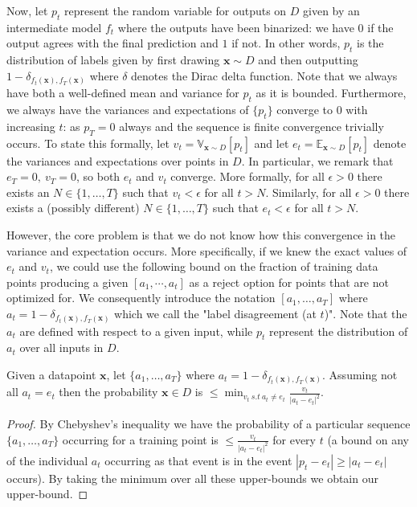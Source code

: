 Now, let $p_{t}$ represent the random variable for outputs on $D$ given by an intermediate model $f_t$ where the outputs have been binarized: we have $0$ if the output agrees with the final prediction and $1$ if not. In other words, $p_{t}$ is the distribution of labels given by first drawing $\bm{x} \sim D$ and then outputting $1- \delta_{f_t(\bm{x}),f_T(\bm{x})}$ where $\delta$ denotes the Dirac delta function. Note that we always have both a well-defined mean and variance for $p_{t}$ as it is bounded. Furthermore, we always have the variances and expectations of $\{p_{t}\}$ converge to $0$ with increasing $t$: as $p_{T} = 0$ always and the sequence is finite convergence trivially occurs. To state this formally, let $v_t = \mathbb{V}_{\bm{x} \sim D}[p_{t}]$ and let $e_t = \mathbb{E}_{\bm{x} \sim D}[p_{t}]$ denote the variances and expectations over points in $D$. In particular, we remark that $e_T=0,\ v_T = 0$, so both $e_t$ and $v_t$ converge. More formally, for all $ \epsilon > 0$ there exists an $N \in \{1,\ldots, T\}$ such that $v_t < \epsilon$ for all $t > N$. Similarly, for all $\epsilon > 0$ there exists a (possibly different) $N \in \{1,\ldots, T\}$ such that $e_t < \epsilon$ for all $t > N$.

However, the core problem is that we do not know how this convergence in the variance and expectation occurs. More specifically, if we knew the exact values of $e_t$ and $v_t$, we could use the following bound on the fraction of training data points producing a given $[a_1,\cdots,a_t]$ as a reject option for points that are not optimized for.  We consequently introduce the notation $[a_1,\ldots,a_T]$ where $a_t = 1- \delta_{f_t(\bm{x}),f_T(\bm{x})}$ which we call the "label disagreement (at $t$)". Note that the $a_t$ are defined with respect to a given input, while $p_t$ represent the distribution of $a_t$ over all inputs in $D$.

\begin{lemma}
\label{lem:prob_accept}
Given a datapoint $\bm{x}$,  let $\{a_1,\ldots,a_T\}$ where $a_t = 1- \delta_{f_t(\bm{x}),f_T(\bm{x})}$. Assuming not all $a_t = e_t$ then the probability $\bm{x} \in D$ is  $\leq \min_{v_t~s.t~a_t \neq e_t}  \frac{v_t}{|a_t - e_t|^2}$.
\end{lemma}
\begin{proof}
By Chebyshev's inequality we have the probability of a particular sequence $\{a_1,\ldots,a_T\}$ occurring for a training point is $\leq \frac{v_t}{|a_t - e_t|^2}$ for every $t$ (a bound on any of the individual $a_t$ occurring as that event is in the event $|p_t - e_t| \geq |a_t - e_t|$ occurs). By taking the minimum over all these upper-bounds we obtain our upper-bound.
\end{proof}

